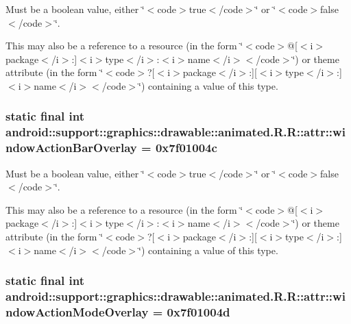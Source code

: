 Must be a boolean value, either \char`\"{}$<$code$>$true$<$/code$>$\char`\"{} or \char`\"{}$<$code$>$false$<$/code$>$\char`\"{}. 

This may also be a reference to a resource (in the form \char`\"{}$<$code$>$@\mbox{[}$<$i$>$package$<$/i$>$:\mbox{]}$<$i$>$type$<$/i$>$:$<$i$>$name$<$/i$>$$<$/code$>$\char`\"{}) or theme attribute (in the form \char`\"{}$<$code$>$?\mbox{[}$<$i$>$package$<$/i$>$:\mbox{]}\mbox{[}$<$i$>$type$<$/i$>$:\mbox{]}$<$i$>$name$<$/i$>$$<$/code$>$\char`\"{}) containing a value of this type. \hypertarget{classandroid_1_1support_1_1graphics_1_1drawable_1_1animated_1_1_r_1_1attr_edbe6baa59a11adc0e8e00e88df3db0b}{
\subsubsection[{windowActionBarOverlay}]{\setlength{\rightskip}{0pt plus 5cm}static final int android::support::graphics::drawable::animated.R.R::attr::windowActionBarOverlay = 0x7f01004c}}
\label{classandroid_1_1support_1_1graphics_1_1drawable_1_1animated_1_1_r_1_1attr_edbe6baa59a11adc0e8e00e88df3db0b}


Must be a boolean value, either \char`\"{}$<$code$>$true$<$/code$>$\char`\"{} or \char`\"{}$<$code$>$false$<$/code$>$\char`\"{}. 

This may also be a reference to a resource (in the form \char`\"{}$<$code$>$@\mbox{[}$<$i$>$package$<$/i$>$:\mbox{]}$<$i$>$type$<$/i$>$:$<$i$>$name$<$/i$>$$<$/code$>$\char`\"{}) or theme attribute (in the form \char`\"{}$<$code$>$?\mbox{[}$<$i$>$package$<$/i$>$:\mbox{]}\mbox{[}$<$i$>$type$<$/i$>$:\mbox{]}$<$i$>$name$<$/i$>$$<$/code$>$\char`\"{}) containing a value of this type. \hypertarget{classandroid_1_1support_1_1graphics_1_1drawable_1_1animated_1_1_r_1_1attr_fce1ea0279fc021f94bec66f13ccdba3}{
\subsubsection[{windowActionModeOverlay}]{\setlength{\rightskip}{0pt plus 5cm}static final int android::support::graphics::drawable::animated.R.R::attr::windowActionModeOverlay = 0x7f01004d}}
\label{classandroid_1_1support_1_1graphics_1_1drawable_1_1animated_1_1_r_1_1attr_fce1ea0279fc021f94bec66f13ccdba3}


